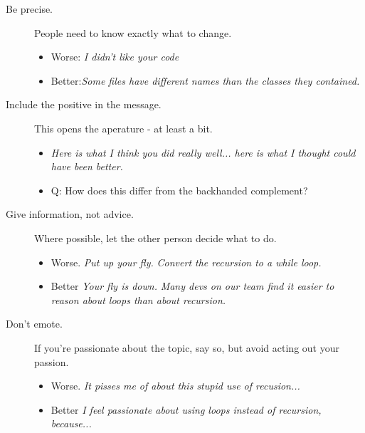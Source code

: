\documentclass{article}
\begin{document}
\begin{tiny}
\begin{multicols}{3}
\begin{tcolorbox}
\begin{description}
            \item[Be precise.] People need to know exactly what to change.
                \begin{itemize}
                   \item Worse: \emph{I didn't like your code} 
                   \item Better:\emph{Some files have different names than the classes they contained.} 
                \end{itemize}
            \item[Include the positive in the message.] This opens the aperature - at least a bit.
                \begin{itemize}
                    \item \emph{Here is what I think you did really well... here is what I thought could have been better.}
                    \item Q: How does this differ from the backhanded complement?
                \end{itemize}
            \item[Give information, not advice.] Where possible, let the other person decide what to do.
                \begin{itemize}
                    \item Worse. \emph{Put up your fly.} \emph{Convert the recursion to a while loop.}
                    \item Better \emph{Your fly is down.} \emph{Many devs on our team find it easier to reason about loops than about recursion.}
                \end{itemize}
            \item[Don't emote.] If you're passionate about the topic, say so, but avoid acting out your passion.
                \begin{itemize}
                    \item Worse. \emph{It pisses me of about this stupid use of recusion...}
                    \item Better \emph{I feel passionate about using loops instead of recursion, because...}
                \end{itemize}
        \end{description}

    \end{tcolorbox}

\end{multicols}


\end{tiny}
\end{document}
